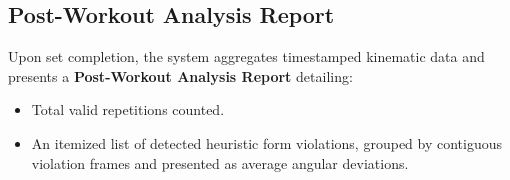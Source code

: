 \normalsize



\vspace{0.3cm}



\subsection{Post-Workout Analysis Report}

\large

Upon set completion, the system aggregates timestamped kinematic data and presents a \textbf{Post-Workout Analysis Report} detailing:
\begin{itemize}
    \item Total valid repetitions counted.
    \item An itemized list of detected heuristic form violations, grouped by contiguous violation frames and presented as average angular deviations.
\end{itemize}

\normalsize

